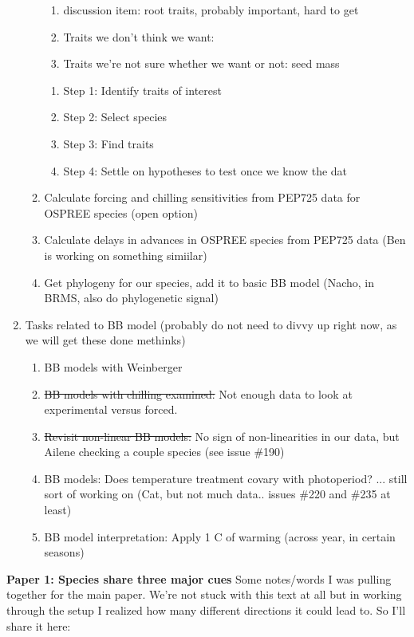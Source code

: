 \documentclass[11pt,letterpaper]{article}
\begin{document}
\begin{enumerate}
\begin{enumerate}
\begin{enumerate}
\item discussion item: root traits, probably important, hard to get
\item Traits we don't think we want: 
\item Traits we're not sure whether we want or not: seed mass
\end{enumerate}
\begin{enumerate}
\item Step 1: Identify traits of interest
\item Step 2: Select species
\item Step 3: Find traits
\item Step 4: Settle on hypotheses to test once we know the dat
\end{enumerate}
\item Calculate forcing and chilling sensitivities from PEP725 data for OSPREE species (open option)
\item Calculate delays in advances in OSPREE species from PEP725 data (Ben is working on something simiilar)
\item Get phylogeny for our species, add it to basic BB model (Nacho, in BRMS, also do phylogenetic signal)
\end{enumerate}
\item Tasks related to BB model (probably do not need to divvy up right now, as we will get these done methinks)
\begin{enumerate}
\item BB models with Weinberger
\item \st{BB models with chilling examined:} Not enough data to look at experimental versus forced. 
\item \st{Revisit non-linear BB models:} No sign of non-linearities in our data, but Ailene checking a couple species (see issue \#190)
\item BB models: Does temperature treatment covary with photoperiod? ... still sort of working on (Cat, but not much data.. issues \#220 and \#235 at least) 
\item BB model interpretation: Apply 1 C of warming (across year, in certain seasons)
\end{enumerate}
\end{enumerate} 

\newpage
{\bf Paper 1: Species share three major cues} %
Some notes/words I was pulling together for the main paper. We're not stuck with this text at all but in working through the setup I realized how many different directions it could lead to. So I'll share it here:
\end{document}

